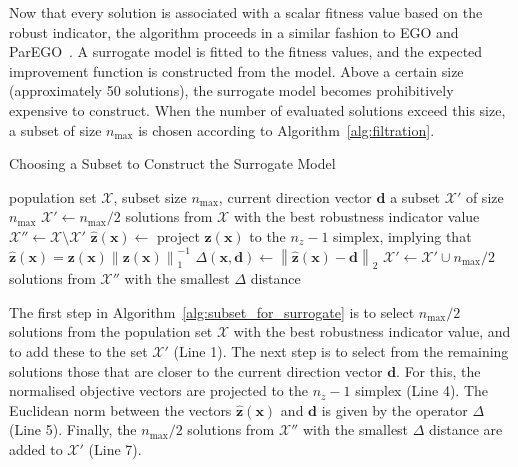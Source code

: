 \documentclass{llncs}
\newcommand{\brr}[1]{{\left({#1}\right)}} %
\newcommand{\norm}[2]{\left\|{#1}\right\|_{#2}} %
\newcommand{\vx}{\mathbf{x}} %
\newcommand{\vz}{\mathbf{z}} %
\newcommand{\vd}{\mathbf{d}} %
\newcommand{\XSet}{\mathcal{X}} %
\begin{document}
Now that every solution is associated with a scalar fitness value based on the robust indicator, the algorithm proceeds in a similar fashion to EGO and ParEGO~\cite{Jones1998Efficient,knowles2005multiobjective}. A surrogate model is fitted to the fitness values, and the expected improvement function is constructed from the model. Above a certain size (approximately 50 solutions), the surrogate model becomes prohibitively expensive to construct. When the number of evaluated solutions exceed this size, a subset of size $n_\text{max}$ is chosen according to Algorithm~\ref{alg:filtration}.

\begin{algorithm}
\caption{Choosing a Subset to Construct the Surrogate Model}
\label{alg:filtration}
\begin{algorithmic}[1]
        \Require population set $\XSet$, subset size $n_\text{max}$, current direction vector $\vd$
        \Ensure a subset $\XSet'$ of size $n_\text{max}$
        \State $\XSet' \leftarrow n_\text{max}/2$ solutions from $\XSet$ with the best robustness indicator value
        \State $\XSet'' \leftarrow \XSet \setminus \XSet'$
        \ForAll{$\vx \in \XSet''$}
                \State $\hat{\vz}\brr{\vx} \leftarrow$ project $\vz\brr{\vx}$ to the $n_z-1$ simplex, implying that $\hat{\vz}\brr{\vx} = \vz\brr{\vx} \norm{\vz\brr{\vx}}{1}^{-1}$
                \State $\Delta\brr{\vx, \vd} \leftarrow \norm{\hat{\vz}\brr{\vx} - \vd}{2}$
        \EndFor
        \State $\XSet' \leftarrow \XSet' \cup n_\text{max}/2$ solutions from $\XSet''$ with the smallest $\Delta$ distance
\end{algorithmic}
\label{alg:subset_for_surrogate}
\end{algorithm}

The first step in Algorithm~\ref{alg:subset_for_surrogate} is to select $n_\text{max}/2$ solutions from the population set $\XSet$ with the best robustness indicator value, and to add these to the set $\XSet'$ (Line 1). The next step is to select from the remaining solutions those that are closer to the current direction vector $\vd$. For this, the normalised objective vectors are projected to the $n_z-1$ simplex (Line 4). The Euclidean norm between the vectors $\hat{\vz}\brr{\vx}$ and $\vd$ is given by the operator $\Delta$ (Line 5). Finally, the $n_\text{max}/2$ solutions from $\XSet''$ with the smallest $\Delta$ distance are added to $\XSet'$ (Line 7).
\end{document}
